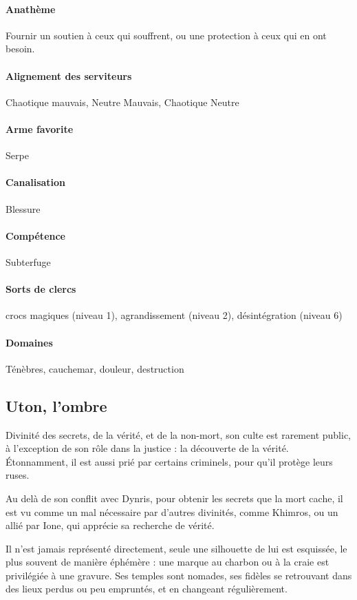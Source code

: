 \documentclass[10pt,a4paper]{book}
\begin{document}
\paragraph{Anathème} Fournir un soutien à ceux qui souffrent, ou une protection à ceux qui en ont besoin.
\paragraph{Alignement des serviteurs} Chaotique mauvais, Neutre Mauvais, Chaotique Neutre
\paragraph{Arme favorite }Serpe
\paragraph{Canalisation} Blessure
\paragraph{Compétence}Subterfuge
\paragraph{Sorts de clercs}crocs magiques (niveau 1), agrandissement (niveau 2), désintégration (niveau 6)
\paragraph{Domaines }Ténèbres, cauchemar, douleur, destruction
\subsection{Uton, l'ombre}
Divinité des secrets, de la vérité, et de la non-mort, son culte est rarement public, à l'exception de son rôle dans la justice : la découverte de la vérité. Étonnamment, il est aussi prié par certains criminels, pour qu'il protège leurs ruses.

Au delà de son conflit avec Dynris, pour obtenir les secrets que la mort cache, il est vu comme un mal nécessaire par d'autres divinités, comme Khimros, ou un allié par Ione, qui apprécie sa recherche de vérité.

Il n'est jamais représenté directement, seule une silhouette de lui est esquissée, le plus souvent de manière éphémère : une marque au charbon ou à la craie est privilégiée à une gravure. Ses temples sont nomades, ses fidèles se retrouvant dans des lieux perdus ou peu empruntés, et en changeant régulièrement.
\end{document}
